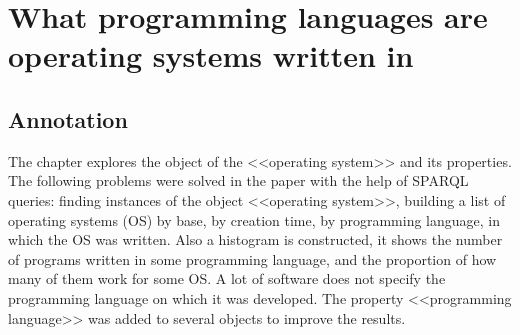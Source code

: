 \setchapterpreamble[u]{\margintoc}
\chapter[line 1 line 2]{What programming languages are operating systems written in}

\section{Annotation}
The chapter explores the object of the <<operating system>> and its properties. The following problems were solved in the paper with the help of SPARQL queries: finding instances of the object <<operating system>>, building a list of operating systems (OS) by base, by creation time, by programming language, in which the OS was written. Also a histogram is constructed, it shows the number of programs written in some programming language, and the proportion of how many of them work for some OS. A lot of software does not specify the programming language on which it was developed. The property <<programming language>> was added to several objects to improve the results.
